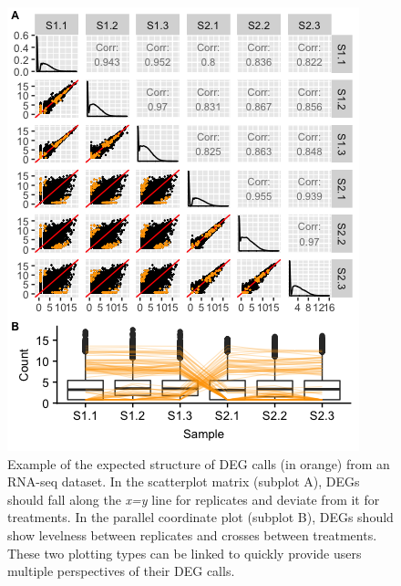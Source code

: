 \documentclass[11pt,a4paper,oldfontcommands,openany]{memoir}
\numberwithin{equation}{section} %
\begin{document}
\begin{figure}[!tpb]
\begin{framed}
\centerline{\includegraphics[width=\columnwidth]{MakeFigures/sbIRDEG.jpg}}
\end{framed}
\caption{Example of the expected structure of DEG calls (in orange) from an RNA-seq dataset. In the scatterplot matrix (subplot A), DEGs should fall along the \textit{x=y} line for replicates and deviate from it for treatments. In the parallel coordinate plot (subplot B), DEGs should show levelness between replicates and crosses between treatments. These two plotting types can be linked to quickly provide users multiple perspectives of their DEG calls.
\label{sbIRDEG}}
\end{figure}
\end{document}
